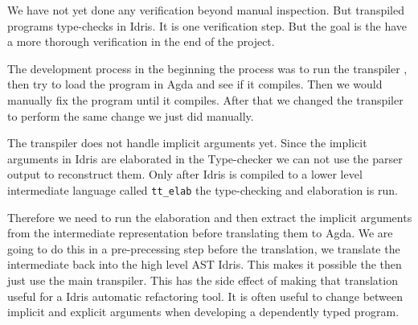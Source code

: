 

We have not yet done any verification beyond manual inspection.  But transpiled
programs type-checks in Idris. It is one verification step.  But the goal is
the have a more thorough verification in the end of the project.

The development process in the beginning the process was to run the transpiler , then try to load the program in Agda and see if it compiles.
Then we would manually fix the program until it compiles.
After that we changed the transpiler to perform the same change we just did
manually.


The transpiler does not handle implicit arguments yet.
Since the implicit arguments in Idris are elaborated in the Type-checker we can
not use the parser output to reconstruct them.
Only after Idris is compiled to a lower level intermediate
language called \texttt{tt\_elab} the type-checking and elaboration is run.

Therefore we need to run the elaboration and then extract the implicit
arguments from the intermediate representation before translating them to
Agda.  We are going to do this in a pre-precessing step before the translation,
we translate the intermediate back into the high level AST Idris. This makes it
possible the then just use the main transpiler.  This has the side effect of
making that translation useful for a Idris automatic refactoring tool. It is
often useful to change between implicit and explicit arguments when developing
a dependently typed program.



